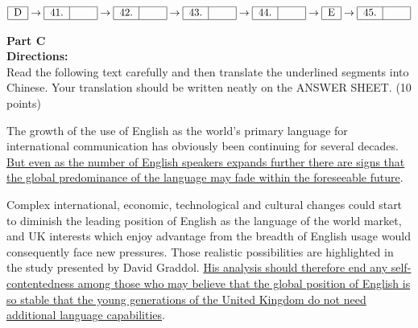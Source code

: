 \[ 
\begin{tabular}{|c|}
	\hline
	D \\
	\hline
\end{tabular}
\rightarrow
\begin{tabular}{|c|c|}
	\hline
	41. &  \hspace{1.5em} \\
	\hline
\end{tabular}
\rightarrow
\begin{tabular}{|c|c|}
	\hline
	42. &  \hspace{1.5em} \\
	\hline
\end{tabular}
\rightarrow
\begin{tabular}{|c|c|}
	\hline
	43. &  \hspace{1.5em} \\
	\hline
\end{tabular}
\rightarrow
\begin{tabular}{|c|c|}
	\hline
	44. &  \hspace{1.5em} \\
	\hline
\end{tabular}
\rightarrow
\begin{tabular}{|c|}
	\hline
	E \\
	\hline
\end{tabular}
\rightarrow
\begin{tabular}{|c|c|}
	\hline
	45. &  \hspace{1.5em} \\
	\hline
\end{tabular}
\]


\phantom{ \linefill \linefill \linefill \linefill \linefill}



\newpage
\noindent
\textbf{Part C}\\
\textbf{Directions:}\\
Read the following text carefully and then translate the underlined
segments into Chinese. Your translation should be written neatly on the
ANSWER SHEET. (10 points)


\TiGanSpace

The growth of the use of English as the world's primary language for
international communication has obviously been continuing for several
decades. \transnum \uline{But even as the number of English speakers
	expands further there are signs that the global predominance of the
	language may fade within the foreseeable future}.

Complex international, economic, technological and cultural changes
could start to diminish the leading position of English as the language
of the world market, and UK interests which enjoy advantage from the
breadth of English usage would consequently face new pressures. Those
realistic possibilities are highlighted in the study presented by David
Graddol. \transnum \uline{His analysis should therefore end any
	self-contentedness among those who may believe that the global position
	of English is so stable that the young generations of the United Kingdom
	do not need additional language capabilities}.

